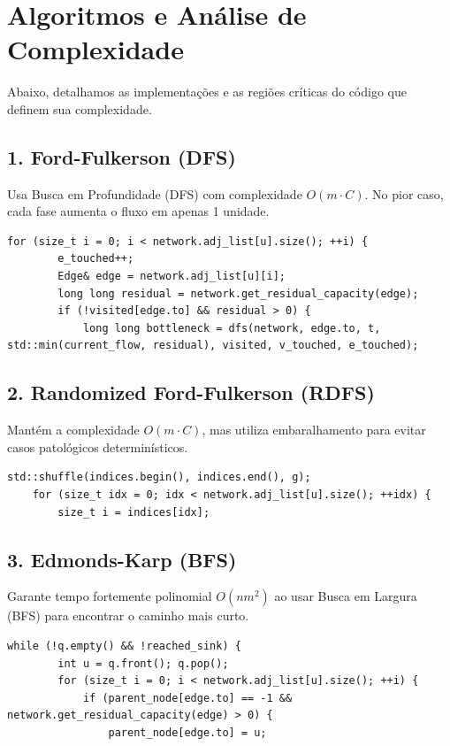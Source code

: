 \documentclass{infufrgs}
\begin{document}
\section{Algoritmos e Análise de Complexidade}
Abaixo, detalhamos as implementações e as regiões críticas do código que definem sua complexidade.

\subsection{1. Ford-Fulkerson (DFS)}
Usa Busca em Profundidade (DFS) com complexidade $O(m \cdot C)$. No pior caso, cada fase aumenta o fluxo em apenas 1 unidade.
\begin{lstlisting}[caption={Busca de caminho via DFS em FordFulkersonDFS.cpp}]
    for (size_t i = 0; i < network.adj_list[u].size(); ++i) {
        e_touched++; 
        Edge& edge = network.adj_list[u][i];
        long long residual = network.get_residual_capacity(edge);
        if (!visited[edge.to] && residual > 0) {
            long long bottleneck = dfs(network, edge.to, t, std::min(current_flow, residual), visited, v_touched, e_touched);
\end{lstlisting}

\subsection{2. Randomized Ford-Fulkerson (RDFS)}
Mantém a complexidade $O(m \cdot C)$, mas utiliza embaralhamento para evitar casos patológicos determinísticos.
\begin{lstlisting}[caption={Embaralhamento de arestas em FordFulkersonRandDFS.cpp}]
    std::shuffle(indices.begin(), indices.end(), g); 
    for (size_t idx = 0; idx < network.adj_list[u].size(); ++idx) {
        size_t i = indices[idx]; 
\end{lstlisting}

\subsection{3. Edmonds-Karp (BFS)}
Garante tempo fortemente polinomial $O(nm^2)$ ao usar Busca em Largura (BFS) para encontrar o caminho mais curto.
\begin{lstlisting}[caption={Travessia BFS em EdmondsKarp.cpp}]
    while (!q.empty() && !reached_sink) {
        int u = q.front(); q.pop();
        for (size_t i = 0; i < network.adj_list[u].size(); ++i) {
            if (parent_node[edge.to] == -1 && network.get_residual_capacity(edge) > 0) {
                parent_node[edge.to] = u;
\end{lstlisting}
\end{document}
